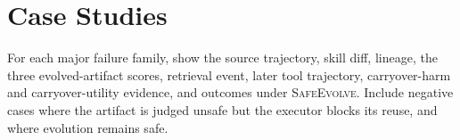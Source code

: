 \documentclass{article}
\newcommand{\safeevolve}{\textsc{SafeEvolve}\xspace}
\begin{document}
\section{Case Studies}
\label{app:case-studies}

For each major failure family, show the source trajectory, skill diff, lineage,
the three evolved-artifact scores, retrieval event, later tool trajectory,
carryover-harm and carryover-utility evidence, and outcomes under \safeevolve.
Include negative cases where the artifact is judged unsafe but the executor
blocks its reuse, and where evolution remains safe.
\end{document}
